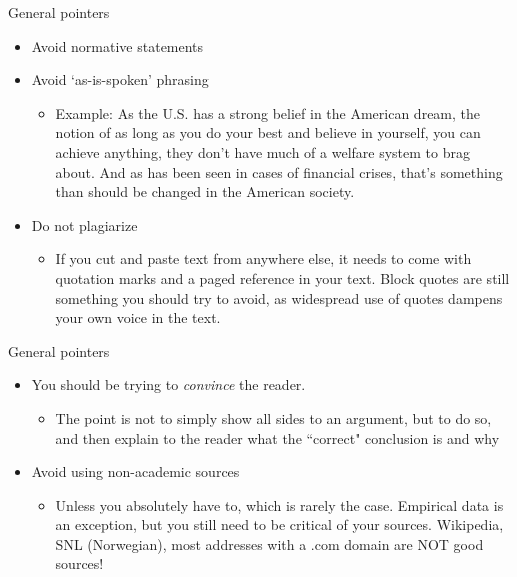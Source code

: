 \documentclass{beamer}
\begin{document}
\begin{frame}{General pointers}

\begin{itemize}

	\item Avoid normative statements 
	\item Avoid `as-is-spoken' phrasing
		\begin{itemize}

		\item Example: As the U.S. has a strong belief in the American
			dream, the notion of as long as you do your best and
			believe in yourself, you can achieve anything, they
			don’t have much of a welfare system to brag about. And
			as has been seen in cases of financial crises, that’s
			something than should be changed in the American
			society. \pause

		\end{itemize}

	\item Do not plagiarize\pause
	\begin{itemize}
		\item  If you cut and paste text from anywhere else, it needs to come
		with quotation marks and a paged reference in your text. Block
		quotes are still something you should try to avoid, as
		widespread use of quotes dampens your own voice in the text.
	\end{itemize}
\end{itemize}	

\end{frame}

\begin{frame}{General pointers}

	\begin{itemize}
		\item You should be trying to \textit{convince} the reader. 
			\begin{itemize}
				\item The point is not to simply show all sides
					to an argument, but to do so, and then
					explain to the reader what the
					``correct" conclusion is and why \pause
			\end{itemize}

		\item Avoid using non-academic sources
		\begin{itemize}
			\item Unless you absolutely have to, which
			is rarely the case. Empirical data is an exception, but
			you still need to be critical of your sources.
			Wikipedia, SNL (Norwegian), most addresses with a .com
			domain are NOT good sources! 
		\end{itemize}
	\end{itemize}

\end{frame}
\end{document}
